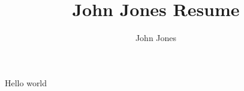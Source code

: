 \documentclass{article}
\title{John Jones Resume}
\author{John Jones}
\begin{document}
Hello world
\end{document}
